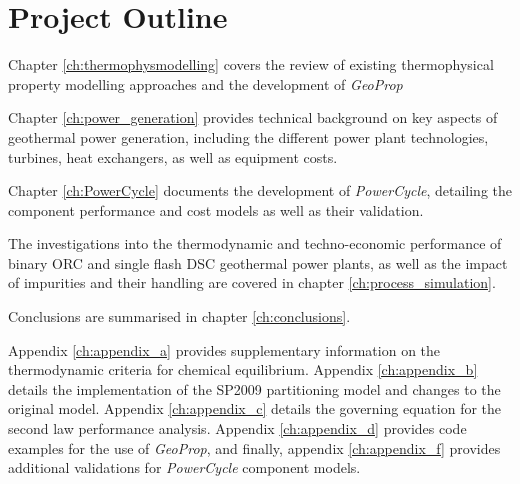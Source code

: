\section{Project Outline}
\label{sec:project_outline}

    Chapter \ref{ch:thermophysmodelling} covers the review of existing thermophysical property modelling approaches and the development of \emph{GeoProp}

    Chapter \ref{ch:power_generation} provides technical background on key aspects of geothermal power generation, including the different power plant technologies, turbines, heat exchangers, as well as equipment costs.

    Chapter \ref{ch:PowerCycle} documents the development of \emph{PowerCycle}, detailing the component performance and cost models as well as their validation.

    The investigations into the thermodynamic and techno-economic performance of binary \ac{ORC} and single flash \ac{DSC} geothermal power plants, as well as the impact of impurities and their handling are covered in chapter \ref{ch:process_simulation}.

    Conclusions are summarised in chapter \ref{ch:conclusions}.

    Appendix \ref{ch:appendix_a} provides supplementary information on the thermodynamic criteria for chemical equilibrium. Appendix \ref{ch:appendix_b} details the implementation of the \ac{SP2009} partitioning model and changes to the original model. Appendix \ref{ch:appendix_c} details the governing equation for the second law performance analysis. Appendix \ref{ch:appendix_d} provides code examples for the use of \emph{GeoProp}, and finally, appendix \ref{ch:appendix_f} provides additional validations for \emph{PowerCycle} component models.
    